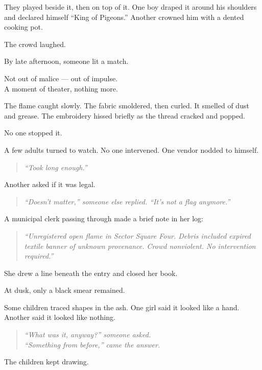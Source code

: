 \documentclass[12pt]{article}
\begin{document}
They played beside it, then on top of it. One boy draped it around his shoulders and declared himself “King of Pigeons.” Another crowned him with a dented cooking pot.

The crowd laughed.

By late afternoon, someone lit a match.

Not out of malice --- out of impulse.\\
A moment of theater, nothing more.

The flame caught slowly. The fabric smoldered, then curled. It smelled of dust and grease. The embroidery hissed briefly as the thread cracked and popped.

No one stopped it.

A few adults turned to watch. No one intervened. One vendor nodded to himself.

\begin{quote}
\textit{“Took long enough.”}
\end{quote}

Another asked if it was legal.

\begin{quote}
\textit{“Doesn’t matter,” someone else replied. “It’s not a flag anymore.”}
\end{quote}

\vspace{1em}

A municipal clerk passing through made a brief note in her log:

\begin{quote}
\textit{“Unregistered open flame in Sector Square Four. Debris included expired textile banner of unknown provenance. Crowd nonviolent. No intervention required.”}
\end{quote}

She drew a line beneath the entry and closed her book.

\vspace{1em}

At dusk, only a black smear remained.

Some children traced shapes in the ash. One girl said it looked like a hand. Another said it looked like nothing.

\begin{quote}
\textit{“What was it, anyway?” someone asked.}
\\
\textit{“Something from before,” came the answer.}
\end{quote}

The children kept drawing.
\end{document}
